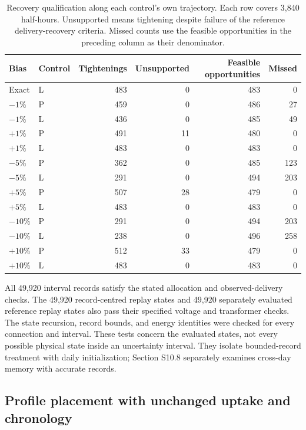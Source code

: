 \documentclass[11pt]{article}
\begin{document}
\begin{table}[!ht]
\centering
\caption{Recovery qualification along each control's own trajectory.
Each row covers 3,840 half-hours. Unsupported means tightening despite
failure of the reference delivery-recovery criteria. Missed counts use
the feasible opportunities in the preceding column as their denominator.}
\label{tab:supp_record_recovery}
\vspace{3pt}
\small
\begin{tabular}{@{}llrrrr@{}}
\toprule
Bias & Control & Tightenings & Unsupported & Feasible opportunities & Missed \\
\midrule
Exact & L & 483 & 0 & 483 & 0 \\
$-1\%$ & P & 459 & 0 & 486 & 27 \\
$-1\%$ & L & 436 & 0 & 485 & 49 \\
$+1\%$ & P & 491 & 11 & 480 & 0 \\
$+1\%$ & L & 483 & 0 & 483 & 0 \\
$-5\%$ & P & 362 & 0 & 485 & 123 \\
$-5\%$ & L & 291 & 0 & 494 & 203 \\
$+5\%$ & P & 507 & 28 & 479 & 0 \\
$+5\%$ & L & 483 & 0 & 483 & 0 \\
$-10\%$ & P & 291 & 0 & 494 & 203 \\
$-10\%$ & L & 238 & 0 & 496 & 258 \\
$+10\%$ & P & 512 & 33 & 479 & 0 \\
$+10\%$ & L & 483 & 0 & 483 & 0 \\
\bottomrule
\end{tabular}
\end{table}

All 49,920 interval records satisfy the stated allocation and observed-delivery
checks. The 49,920 record-centred replay states and 49,920 separately evaluated
reference replay states also pass their specified voltage and transformer
checks. The state recursion, record bounds, and energy identities were checked
for every connection and interval. These tests concern the evaluated states,
not every possible physical state inside an uncertainty interval. They isolate
bounded-record treatment with daily initialization; Section S10.8 separately
examines cross-day memory with accurate records.

\subsection{Profile placement with unchanged uptake and chronology}
\label{supp:mapping}
\end{document}
